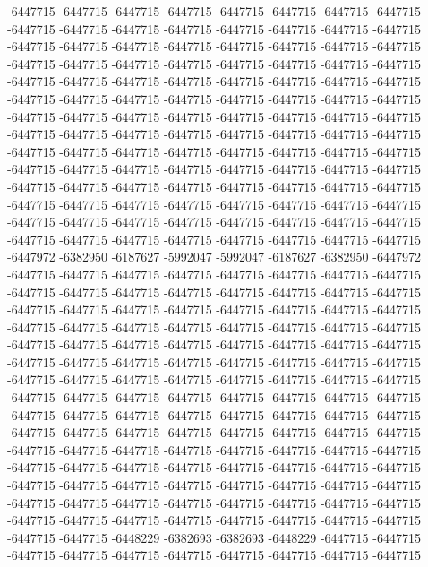 -6447715 -6447715 -6447715 -6447715 -6447715 -6447715 -6447715 -6447715 -6447715 -6447715 -6447715 -6447715 -6447715 -6447715 -6447715 -6447715 -6447715 -6447715 -6447715 -6447715 -6447715 -6447715 -6447715 -6447715 -6447715 -6447715 -6447715 -6447715 -6447715 -6447715 -6447715 -6447715 -6447715 -6447715 -6447715 -6447715 -6447715 -6447715 -6447715 -6447715 -6447715 -6447715 -6447715 -6447715 -6447715 -6447715 -6447715 -6447715 -6447715 -6447715 -6447715 -6447715 -6447715 -6447715 -6447715 -6447715 -6447715 -6447715 -6447715 -6447715 -6447715 -6447715 -6447715 -6447715 -6447715 -6447715 -6447715 -6447715 -6447715 -6447715 -6447715 -6447715 -6447715 -6447715 -6447715 -6447715 -6447715 -6447715 -6447715 -6447715 -6447715 -6447715 -6447715 -6447715 -6447715 -6447715 -6447715 -6447715 -6447715 -6447715 -6447715 -6447715 -6447715 -6447715 -6447715 -6447715 -6447715 -6447715 -6447715 -6447715 -6447715 -6447715 -6447715 -6447715 -6447715 -6447715 -6447715 -6447715 -6447715 -6447715 -6447715 -6447715 -6447972 -6382950 -6187627 -5992047 -5992047 -6187627 -6382950 -6447972 -6447715 -6447715 -6447715 -6447715 -6447715 -6447715 -6447715 -6447715
-6447715 -6447715 -6447715 -6447715 -6447715 -6447715 -6447715 -6447715 -6447715 -6447715 -6447715 -6447715 -6447715 -6447715 -6447715 -6447715 -6447715 -6447715 -6447715 -6447715 -6447715 -6447715 -6447715 -6447715 -6447715 -6447715 -6447715 -6447715 -6447715 -6447715 -6447715 -6447715 -6447715 -6447715 -6447715 -6447715 -6447715 -6447715 -6447715 -6447715 -6447715 -6447715 -6447715 -6447715 -6447715 -6447715 -6447715 -6447715 -6447715 -6447715 -6447715 -6447715 -6447715 -6447715 -6447715 -6447715 -6447715 -6447715 -6447715 -6447715 -6447715 -6447715 -6447715 -6447715 -6447715 -6447715 -6447715 -6447715 -6447715 -6447715 -6447715 -6447715 -6447715 -6447715 -6447715 -6447715 -6447715 -6447715 -6447715 -6447715 -6447715 -6447715 -6447715 -6447715 -6447715 -6447715 -6447715 -6447715 -6447715 -6447715 -6447715 -6447715 -6447715 -6447715 -6447715 -6447715 -6447715 -6447715 -6447715 -6447715 -6447715 -6447715 -6447715 -6447715 -6447715 -6447715 -6447715 -6447715 -6447715 -6447715 -6447715 -6447715 -6447715 -6447715 -6448229 -6382693 -6382693 -6448229 -6447715 -6447715 -6447715 -6447715 -6447715 -6447715 -6447715 -6447715 -6447715 -6447715
